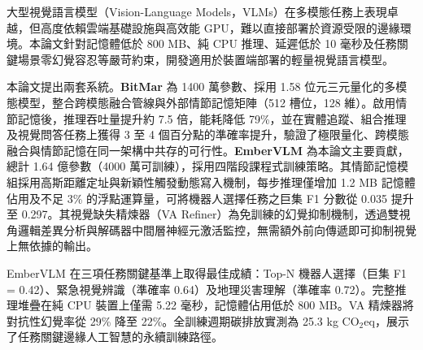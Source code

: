 {\renewcommand{\baselinestretch}{1.2}\normalsize
大型視覺語言模型（Vision-Language Models，VLMs）在多模態任務上表現卓越，但高度依賴雲端基礎設施與高效能 GPU，難以直接部署於資源受限的邊緣環境。本論文針對記憶體低於 800 MB、純 CPU 推理、延遲低於 10 毫秒及任務關鍵場景零幻覺容忍等嚴苛約束，開發適用於裝置端部署的輕量視覺語言模型。

本論文提出兩套系統。\textbf{BitMar} 為 1400 萬參數、採用 1.58 位元三元量化的多模態模型，整合跨模態融合管線與外部情節記憶矩陣（512 槽位，128 維）。啟用情節記憶後，推理吞吐量提升約 7.5 倍，能耗降低 79\%，並在實體追蹤、組合推理及視覺問答任務上獲得 3 至 4 個百分點的準確率提升，驗證了極限量化、跨模態融合與情節記憶在同一架構中共存的可行性。\textbf{EmberVLM} 為本論文主要貢獻，總計 1.64 億參數（4000 萬可訓練），採用四階段課程式訓練策略。其情節記憶模組採用高斯距離定址與新穎性觸發動態寫入機制，每步推理僅增加 1.2 MB 記憶體佔用及不足 3\% 的浮點運算量，可將機器人選擇任務之巨集 F1 分數從 0.035 提升至 0.297。其視覺缺失精煉器（VA Refiner）為免訓練的幻覺抑制機制，透過雙視角邏輯差異分析與解碼器中間層神經元激活監控，無需額外前向傳遞即可抑制視覺上無依據的輸出。

EmberVLM 在三項任務關鍵基準上取得最佳成績：Top-N 機器人選擇（巨集 F1 = 0.42）、緊急視覺辨識（準確率 0.64）及地理災害理解（準確率 0.72）。完整推理堆疊在純 CPU 裝置上僅需 5.22 毫秒，記憶體佔用低於 800 MB。VA 精煉器將對抗性幻覺率從 29\% 降至 22\%。全訓練週期碳排放實測為 25.3 kg CO$_2$eq，展示了任務關鍵邊緣人工智慧的永續訓練路徑。

}
